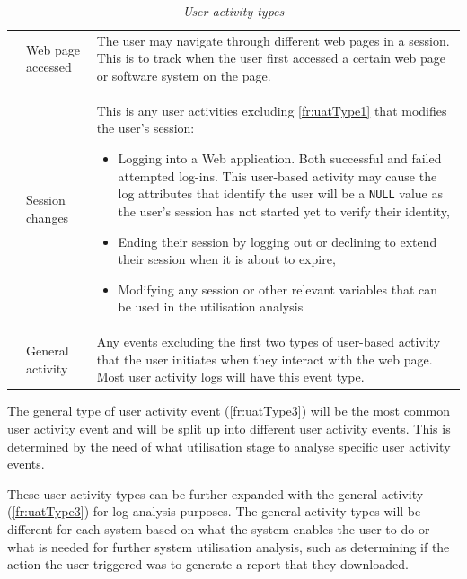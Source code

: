 \begin{table}[!htb]
	\centering
	\caption[User activity types]
	{\textit{User activity types}}
	\label{tbl:ch2_userActivityTypes}
	\begin{tabularx}{\textwidth}{llX}
		\toprule
		\thead{Req. ID} & \thead{Activity Type} & \thead{Description} \\
		\midrule

		\rowcolor{lightgray}
		\subsubphase{fr:uatType1} & Web page accessed & The user may navigate through different web pages in a session. This is to track when the user first accessed a certain web page or software system on the page. \\


		\subsubphase{fr:uatType2} & Session changes & This is any user activities excluding \ref{fr:uatType1} that modifies the user's session:
		\begin{itemize}
			\item Logging into a Web application. Both successful and failed attempted log-ins. This user-based activity may cause the log attributes that identify the user will be a \texttt{NULL} value as the user's session has not started yet to verify their identity,
			\item Ending their session by logging out or declining to extend their session when it is about to expire,
			\item Modifying any session or other relevant variables that can be used in the utilisation analysis
		\end{itemize}\\

		\rowcolor{lightgray}
		\subsubphase{fr:uatType3} & General activity & Any events excluding the first two types of user-based activity that the user initiates when they interact with the web page. Most user activity logs will
		have this event type.\\ 
		\bottomrule
	\end{tabularx}
\end{table}

The general type of user activity event (\ref{fr:uatType3}) will be the most common user activity event and will be split up into different user activity events. This is determined by the need of what utilisation stage to analyse specific user activity events. \par These user activity types can be further expanded with the general activity (\ref{fr:uatType3}) for log analysis purposes. The general activity types will be different for each system based on what the system enables the user to do or what is needed for further system utilisation analysis, such as determining if the action the user triggered was to generate a report that they downloaded.


